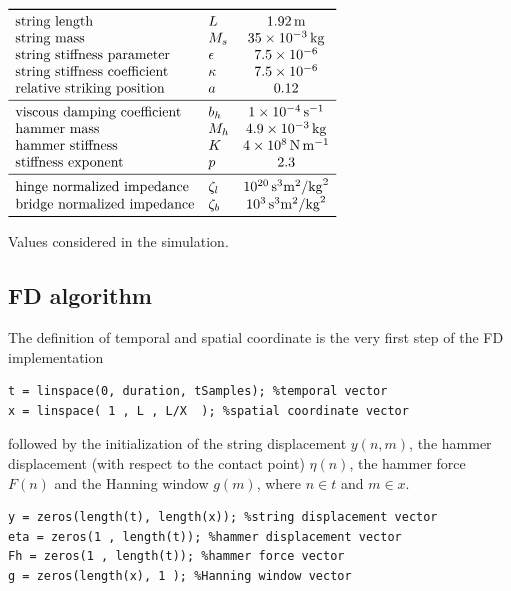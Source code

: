\documentclass[a4paper]{article}
\begin{document}
 \begin{table}[h]
	\centering
	$\begin{array}{llc}
		\toprule
		\text{string length} &	L & \SI{1.92}{\meter}\\
		\text{string mass}   &	M_s & \SI{35e-3}{\kilogram}\\
		\text{string stiffness parameter} &	\epsilon & 7.5 	\times 10^{-6}\\
		\text{string stiffness coefficient} &	\kappa & 7.5 	\times 10^{-6}\\
		\text{relative striking position} &	a & 0.12 \\
		\midrule
		\text{viscous damping coefficient} & b_h & \SI{1e-4}{\second^{-1}}\\
		\text{hammer mass} & M_h & \SI{4.9e-3}{\kilogram} \\
		\text{hammer stiffness} &K & \SI{4e8}{\newton\per\meter}\\
		\text{stiffness exponent} &	p & 2.3 \\
		\midrule
		\text{hinge normalized impedance} &	\zeta_l & \SI{e20}{\second^3\meter^2\per\kilogram^2} \\
		\text{bridge normalized impedance} &	\zeta_b & \SI{e3}{\second^3\meter^2\per\kilogram^2} \\		
		\bottomrule
	\end{array}$
	\caption{Values considered in the simulation.}
	\label{tab:vals}
\end{table}

\subsection{FD algorithm}
The definition of temporal and spatial coordinate is the very first step of the FD implementation  
\begin{verbatim}
t = linspace(0, duration, tSamples); %temporal vector 
x = linspace( 1 , L , L/X  ); %spatial coordinate vector
\end{verbatim}

followed by the initialization of the string displacement $y(n,m)$, the hammer displacement (with respect to the contact point) $\eta(n)$, the hammer force $F(n)$ and the Hanning window $g(m)$, where $n \in t$ and $m \in x$. 

\begin{verbatim}
y = zeros(length(t), length(x)); %string displacement vector
eta = zeros(1 , length(t)); %hammer displacement vector
Fh = zeros(1 , length(t)); %hammer force vector
g = zeros(length(x), 1 ); %Hanning window vector
\end{verbatim}
\end{document}
